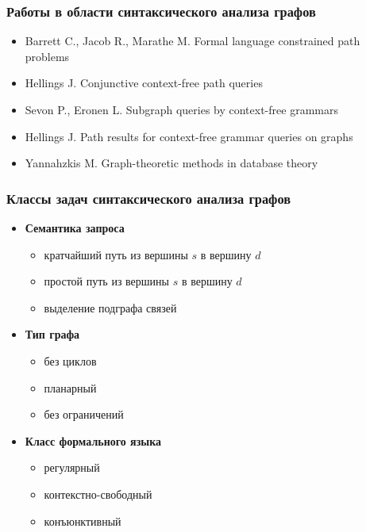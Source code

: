 \documentclass{beamer}
\begin{document}
\begin{frame}[fragile]
	\transwipe[direction=90]
	\frametitle{Работы в области синтаксического анализа графов}
    \begin{itemize}
        \item Barrett C., Jacob R., Marathe M. Formal language constrained path problems
        \item Hellings J. Conjunctive context-free path queries
        \item Sevon P., Eronen L. Subgraph queries by context-free grammars
        \item Hellings J. Path results for context-free grammar queries on graphs
        \item Yannahzkis M. Graph-theoretic methods in database theory
    \end{itemize}   
\end{frame}

\begin{frame}[fragile]
	\transwipe[direction=90]
	\frametitle{Классы задач синтаксического анализа графов}
    \begin{itemize}
        \item \textbf{Семантика запроса}
            \begin{itemize}
                \item кратчайший путь из вершины $s$ в вершину $d$
                \item простой путь из вершины $s$ в вершину $d$
                \item выделение подграфа связей
            \end{itemize}
        \item \textbf{Тип графа}
            \begin{itemize}
                \item без циклов
                \item планарный
                \item без ограничений
            \end{itemize}
        \item \textbf{Класс формального языка}
            \begin{itemize}
                \item регулярный
                \item контекстно-свободный
                \item конъюнктивный
            \end{itemize}
    \end{itemize}   
\end{frame}
\end{document}

